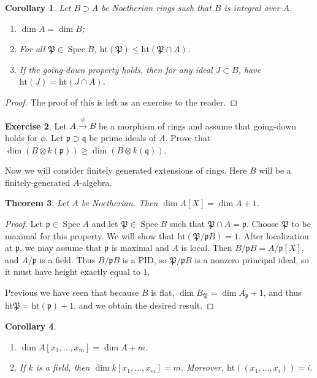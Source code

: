\documentclass[leqno, openany]{memoir}
\newtheorem{thm}{Theorem}[section]
\newtheorem{cor}[thm]{Corollary}
\theoremstyle{definition}
\newtheorem{exer}[thm]{Exercise}
\theoremstyle{remark}
\theoremstyle{plain}
\theoremstyle{definition}
\theoremstyle{remark}
\newcommand{\mf}[1]{\mathfrak{#1}}
\newcommand{\mr}[1]{\mathrm{#1}}
\DeclareMathOperator{\Spec}{Spec}
\begin{document}
\begin{cor}
    Let $B \supset A$ be Noetherian rings such that $B$ is integral over $A$.
    \begin{enumerate}
        \item $\dim A = \dim B$;
        \item For all $\mf{P} \in \Spec B$, $\mr{ht}(\mf{P}) \leq \mr{ht}(\mf{P} \cap A)$.
        \item If the going-down property holds, then for any ideal $J \subset B$, have $\mr{ht}(J) = \mr{ht}(J \cap A)$.
    \end{enumerate}
\end{cor}

\begin{proof}
    The proof of this is left as an exercise to the reader.
\end{proof}

\begin{exer}
    Let $A \xrightarrow{\phi} B$ be a morphism of rings and assume that going-down holds for $\phi$. Let $\mf{p} \supset \mf{q}$ be prime ideals of $A$. Prove that $\dim(B \otimes k(\mf{p})) \geq \dim(B \otimes k(\mf{q}))$.
\end{exer}

Now we will consider finitely generated extensions of rings. Here $B$ will be a finitely-generated $A$-algebra.

\begin{thm}
    Let $A$ be Noetherian. Then $\dim A[X] = \dim A + 1$.
\end{thm}

\begin{proof}
    Let $\mf{p} \in \Spec A$ and let $\mf{P} \in \Spec B$ such that $\mf{P} \cap A = \mf{p}$. Choose $\mf{P}$ to be maximal for this property. We will show that $\mr{ht}(\mf{P} / \mf{p}B) = 1$. After localization at $\mf{p}$, we may assume that $\mf{p}$ is maximal and $A$ is local. Then $B / \mf{p}B = A/\mf{p}[X]$, and $A / \mf{p}$ is a field. Thus $B / \mf{p}B$ is a PID, so $\mf{P} / \mf{p}B$ is a nonzero principal ideal, so it must have height exactly equal to $1$.

    Previous we have seen that because $B$ is flat, $\dim B_{\mf{P}} = \dim A_{\mf{p}} + 1$, and thus $\mr{ht}\mf{P} = \mr{ht}(\mf{p}) + 1$, and we obtain the desired result.
\end{proof}

\begin{cor}
    \begin{enumerate}
        \item $\dim A[x_1, \ldots, x_m] = \dim A + m$.
        \item If $k$ is a field, then $\dim k[x_1, \ldots, x_m] = m$. Moreover, $\mr{ht}((x_1, \ldots, x_i)) = i$.
    \end{enumerate}
\end{cor}
\end{document}
